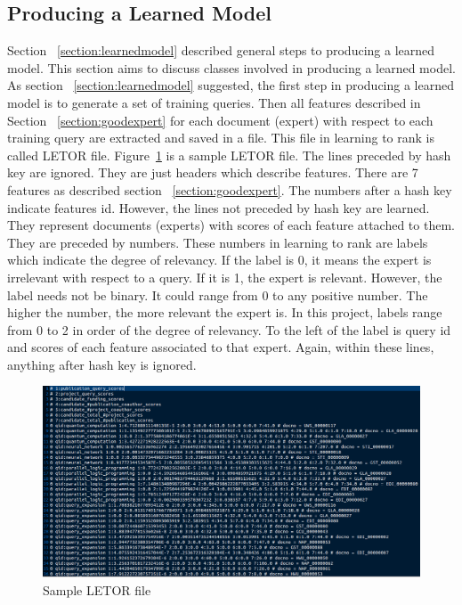 \subsection{Producing a Learned Model}\label{section:producelearnedmodel}
Section ~\ref{section:learnedmodel} described general steps to producing a learned model. This section aims to discuss classes involved in producing a learned model.
As section ~\ref{section:learnedmodel} suggested, the first step in producing a learned model is to generate a set of training queries. 
Then all features described in Section ~\ref{section:goodexpert} for each document (expert) with respect to each training query are extracted and saved
in a file. This file in learning to rank is called LETOR file. Figure~\ref{fig:sampleletorfile} is a sample LETOR file. The lines preceded by hash key are 
ignored. They are just headers which describe features. There are 7 features as described section ~\ref{section:goodexpert}.
The numbers after a hash key indicate features id. However, the lines not preceded by hash key are learned. They represent documents (experts) with scores
of each feature attached to them. They are preceded by numbers. These numbers in learning to rank are labels which indicate the degree of relevancy.
If the label is 0, it means the expert is irrelevant with respect to a query. If it is 1, the expert is relevant. However, the label needs not be binary.
It could range from 0 to any positive number. The higher the number, the more relevant the expert is. In this project, labels range from 0 to 2 in order of 
the degree of relevancy. To the left of the label is query id and scores of each feature associated to that expert. Again, within these lines, anything after hash key is ignored.
\begin{figure}
\centering
\includegraphics[scale=0.3]{./figures/sampleletorfile.png}
\caption{Sample LETOR file} \label{fig:sampleletorfile} 
\end{figure}



